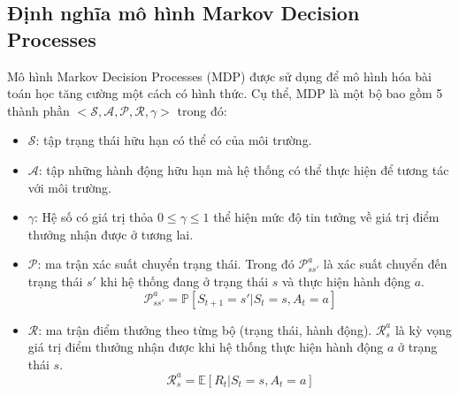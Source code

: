 	\subsection{Định nghĩa mô hình Markov Decision Processes}
	Mô hình Markov Decision Processes (MDP) được sử dụng để mô hình hóa bài toán học tăng cường một cách có hình thức. Cụ thể, MDP là một bộ bao gồm 5 thành phần $<\mathcal{S, A, P, R, \gamma}>$ trong đó:
		\begin{itemize}
			\item $\mathcal{S}$: tập trạng thái hữu hạn có thể có của môi trường.
			\item $\mathcal{A}$: tập những hành động hữu hạn mà hệ thống có thể thực hiện để tương tác với môi trường.
			\item $\gamma$: Hệ số có giá trị thỏa $0\leqslant \gamma \leqslant 1$ thể hiện mức độ tin tưởng về giá trị điểm thưởng nhận được ở tương lai.
			\item $\mathcal{P}$: ma trận xác suất chuyển trạng thái. Trong đó $\mathcal{P}_{ss'}^{a}$ là xác suất chuyển đến trạng thái $s'$ khi hệ thống đang ở trạng thái $s$ và thực hiện hành động $a$.
				\begin{equation}
					\mathcal{P}_{ss'}^{a} = \mathbb{P}[\mathit{S_{t+1}} = s' |\mathit{S_{t}} = s, \mathit{A_{t}} = a]
				\end{equation}
			\item $\mathcal{R}$: ma trận điểm thưởng theo từng bộ (trạng thái, hành động). $\mathcal{R}_{s}^a$ là kỳ vọng giá trị điểm thưởng nhận được khi hệ thống thực hiện hành động $a$ ở trạng thái $s$.
				\begin{equation}
					\mathcal{R}_{s}^a = \mathbb{E}[\mathit{R_{t}} | \mathit{S_{t}} = s, \mathit{A_{t}} = a]
				\end{equation}				
		\end{itemize}
	
